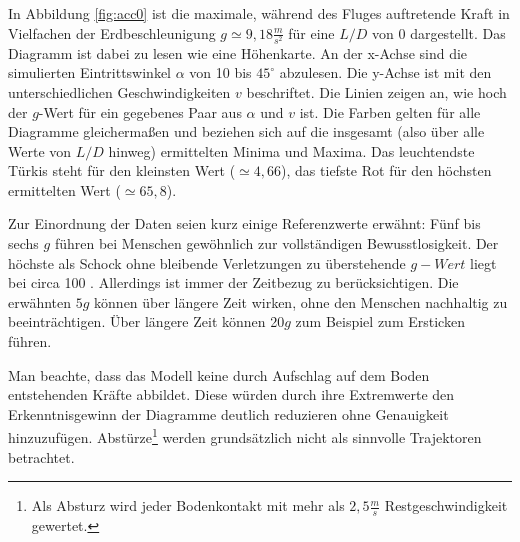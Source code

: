 In Abbildung \ref{fig:acc0} ist die maximale, während des Fluges auftretende Kraft in Vielfachen der Erdbeschleunigung $g \simeq 9,18\frac{m}{s^2}$ für eine $L/D$ von 0 dargestellt. Das Diagramm ist dabei zu lesen wie eine Höhenkarte. An der x-Achse sind die simulierten Eintrittswinkel $\alpha$ von 10 bis $45^{\circ}$ abzulesen. Die y-Achse ist mit den unterschiedlichen Geschwindigkeiten $v$ beschriftet. Die Linien zeigen an, wie hoch der $g$-Wert für ein gegebenes Paar aus $\alpha$ und $v$ ist. Die Farben gelten für alle Diagramme gleichermaßen und beziehen sich auf die insgesamt (also über alle Werte von $L/D$ hinweg) ermittelten Minima und Maxima. Das leuchtendste Türkis steht für den kleinsten Wert ($\simeq 4,66$), das tiefste Rot für den höchsten ermittelten Wert ($\simeq 65,8$).

Zur Einordnung der Daten seien kurz einige Referenzwerte erwähnt: Fünf bis sechs $g$ führen bei Menschen gewöhnlich zur vollständigen Bewusstlosigkeit. Der höchste als Schock ohne bleibende Verletzungen zu überstehende $g-Wert$ liegt bei circa 100 \cite{Shanahan2004}. Allerdings ist immer der Zeitbezug zu berücksichtigen. Die erwähnten $5g$ können über längere Zeit wirken, ohne den Menschen nachhaltig zu beeinträchtigen. Über längere Zeit können 20$g$ zum Beispiel zum Ersticken führen.

Man beachte, dass das Modell keine durch Aufschlag auf dem Boden entstehenden Kräfte abbildet. Diese würden durch ihre Extremwerte den Erkenntnisgewinn der Diagramme deutlich reduzieren ohne Genauigkeit hinzuzufügen. Abstürze\footnote{Als Absturz wird jeder Bodenkontakt mit mehr als $2,5\frac{m}{s}$ Restgeschwindigkeit gewertet.} werden grundsätzlich nicht als sinnvolle Trajektoren betrachtet.

